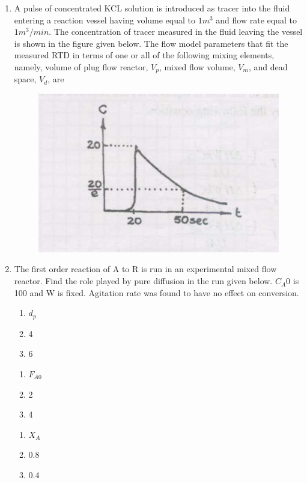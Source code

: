 \documentclass[journal,12pt,onecolumn]{IEEEtran}
\theoremstyle{remark}
\begin{document}
\begin{enumerate}
    \item A pulse of concentrated KCL solution is introduced as tracer into the fluid entering a reaction vessel having volume equal to $1m^{3}$ and flow rate equal to $1m^{3}/min$. The concentration of tracer measured in the fluid leaving the vessel is shown in the figure given below. The flow model parameters that fit the measured RTD in terms of one or all of the following mixing elements, namely, volume of plug flow reactor, $V_p$, mixed flow volume, $V_m$, and dead space, $V_d$, are
    \begin{figure}[H]
        \centering
        \includegraphics[width=0.5\columnwidth]{figs/55.png}
        \caption{}
        \label{fig:55}
    \end{figure}
 
    \item The first order reaction of A to R is run in an experimental mixed flow reactor. Find the role played by pure diffusion in the run given below. $C_A0$ is 100 and W is fixed. Agitation rate was found to have no effect on conversion.

    \begin{multicols}{3}
         \begin{enumerate}[label =]
             \item $d_p$
             \item 4
             \item 6
         \end{enumerate}
         \columnbreak
         \begin{enumerate}[label =]
             \item $F_{A0}$
             \item 2
             \item 4
         \end{enumerate}
         \columnbreak
         \begin{enumerate}[label =]
             \item $X_A$
             \item 0.8
             \item 0.4
         \end{enumerate}
    \end{multicols}


\end{enumerate}
\end{document}
